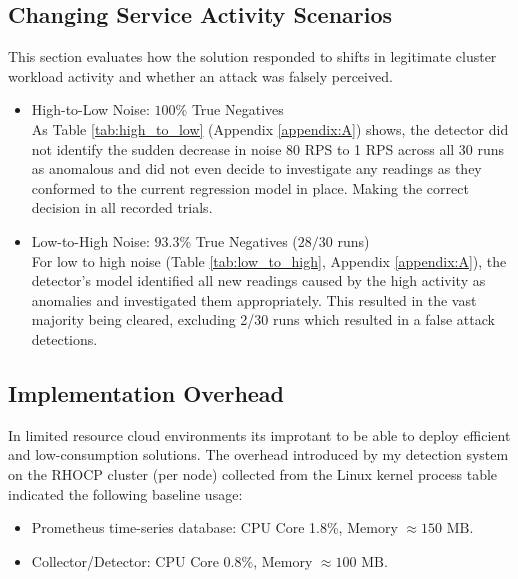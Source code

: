 \documentclass[11pt,a4paper, notitlepage]{article}
\begin{document}
\subsection{Changing Service Activity Scenarios}
This section evaluates how the solution responded to shifts in legitimate cluster workload activity and whether an attack was falsely perceived.
\smallskip
\begin{itemize}[nosep]
    \item High-to-Low Noise: $100\%$ True Negatives \\
    As Table \ref{tab:high_to_low} (Appendix \ref{appendix:A}) shows, the detector did not identify the sudden decrease in noise 80 RPS to 1 RPS across all 30 runs 
    as anomalous and did not even decide to investigate any readings as they conformed to the current regression model in place. Making the correct decision in all
    recorded trials.
    \smallskip
    \item Low-to-High Noise: $93.3\%$ True Negatives ($28/30$ runs) \\
    For low to high noise (Table \ref{tab:low_to_high}, Appendix \ref{appendix:A}), the detector's model identified all new readings caused by the high activity as 
    anomalies and investigated them appropriately. This resulted in the vast majority being cleared, excluding 2/30 runs which resulted in a false attack detections.
\end{itemize}


\subsection{Implementation Overhead}
In limited resource cloud environments its improtant to be able to deploy efficient and low-consumption solutions.
The overhead introduced by my detection system on the RHOCP cluster (per node) collected from the Linux kernel process
table indicated the following baseline usage:
\smallskip
\begin{itemize}[nosep]
    \item Prometheus time-series database: CPU Core 1.8\%, Memory $\approx150\text{~MB}$.
    \smallskip
    \item Collector/Detector: CPU Core 0.8\%, Memory $\approx100\text{~MB}$.
\end{itemize}
\end{document}
